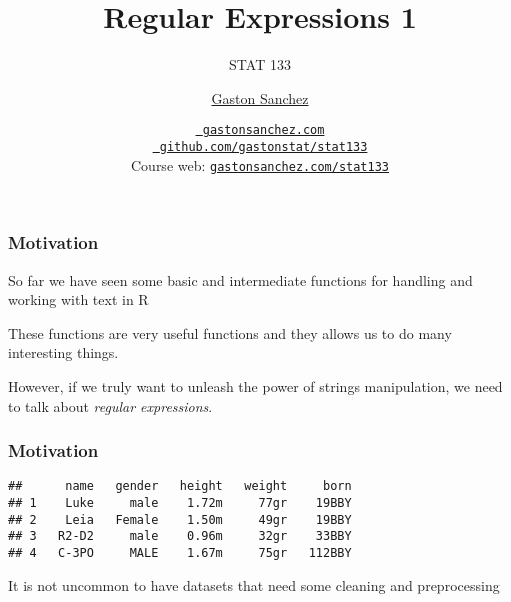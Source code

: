 \documentclass[12pt]{beamer}\usepackage[]{graphicx}\usepackage[]{color}
\title{Regular Expressions 1}
\subtitle{STAT 133}
\author{\href{http://www.gastonsanchez.com}{Gaston Sanchez}}
\institute{Department of Statistics, UC{\textendash}Berkeley}
\date{\href{http://www.gastonsanchez.com}{\tt \scriptsize \color{foreground} gastonsanchez.com}
\\[-4pt]
\href{http://github.com/gastonstat/stat133}{\tt \scriptsize \color{foreground} github.com/gastonstat/stat133}
\\[-4pt]
{\scriptsize Course web: \href{http://www.gastonsanchez.com/stat133}{\tt gastonsanchez.com/stat133}}
}
\makeatletter
\newenvironment{kframe}{%
 \def\at@end@of@kframe{}%
 \ifinner\ifhmode%
  \def\at@end@of@kframe{\end{minipage}}%
  \begin{minipage}{\columnwidth}%
 \fi\fi%
 \def\FrameCommand##1{\hskip\@totalleftmargin \hskip-\fboxsep
 \colorbox{shadecolor}{##1}\hskip-\fboxsep
     \hskip-\linewidth \hskip-\@totalleftmargin \hskip\columnwidth}%
 \MakeFramed {\advance\hsize-\width
   \@totalleftmargin\z@ \linewidth\hsize
   \@setminipage}}%
 {\par\unskip\endMakeFramed%
 \at@end@of@kframe}
\newenvironment{knitrout}{}{} %
\makeatother
\begin{document}
{
  \frame{
    \titlepage
  } 
}


\begin{frame}
\begin{center}
\Huge{}
\end{center}
\end{frame}


\begin{frame}
\frametitle{Motivation}

\bbi
  \item So far we have seen some basic and intermediate functions for handling and working with text in R
  \item These functions are very useful functions and they allows us to do many interesting things. 
  \item However, if we truly want to unleash the power of strings manipulation, we need to talk about \textit{regular expressions}.
\ei



\end{frame}


\begin{frame}[fragile]
\frametitle{Motivation}

\begin{knitrout}\footnotesize
{}\color{fgcolor}\begin{kframe}
\begin{verbatim}
##      name   gender   height   weight     born
## 1    Luke     male    1.72m     77gr    19BBY
## 2    Leia   Female    1.50m     49gr    19BBY
## 3   R2-D2     male    0.96m     32gr    33BBY
## 4   C-3PO     MALE    1.67m     75gr   112BBY
\end{verbatim}
\end{kframe}
\end{knitrout}

\pause
It is not uncommon to have datasets that need some cleaning and preprocessing

\end{frame}

\end{document}
